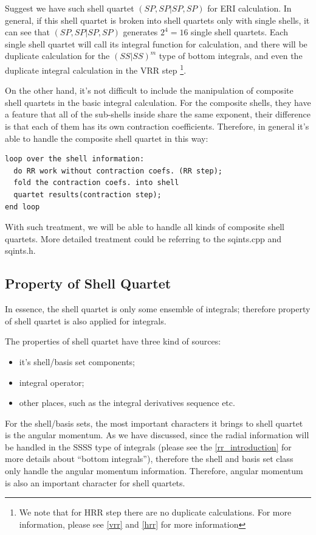 Suggest we have such shell quartet $(SP,SP|SP,SP)$ for ERI calculation.
In general, if this shell quartet is broken into shell quartets only 
with single shells, it can see that $(SP,SP|SP,SP)$ generates $2^{4} = 16$
single shell quartets. Each single shell quartet will call its integral
function for calculation, and there will be duplicate calculation for 
the $(SS|SS)^{m}$ type of bottom integrals, and even the duplicate integral calculation
in the VRR step \footnote{We note that for HRR step there are no duplicate calculations.
For more information, please see \ref{vrr} and \ref{hrr} for more 
information}.

On the other hand, it's not difficult to include the manipulation of 
composite shell quartets in the basic integral calculation. For the 
composite shells, they have a feature that all of the sub-shells inside
share the same exponent, their difference is that each of them has its 
own contraction coefficients. Therefore, in general it's able to handle
the composite shell quartet in this way:
\begin{verbatim}
loop over the shell information:
  do RR work without contraction coefs. (RR step);
  fold the contraction coefs. into shell 
  quartet results(contraction step);
end loop
\end{verbatim}
With such treatment, we will be able to handle all kinds of composite
shell quartets. More detailed treatment could be referring to the 
sqints.cpp and sqints.h.

\subsection{Property of Shell Quartet}
%
%
\label{property_sq}
In essence, the shell quartet is only some ensemble of integrals; therefore
property of shell quartet is also applied for integrals. 

The properties of shell quartet have three kind of sources: 
\begin{itemize}
 \item it's shell/basis set components;
 \item integral operator;
 \item other places, such as the integral derivatives sequence etc.
\end{itemize}

For the shell/basis sets, the most important characters it brings to shell
quartet is the angular momentum. As we have discussed, since the radial 
information will be handled in the SSSS type of integrals (please see the 
\ref{rr_introduction} for more details about ``bottom integrals''), therefore
the shell and basis set class only handle the angular momentum information.
Therefore, angular momentum is also an important character for shell quartets.

